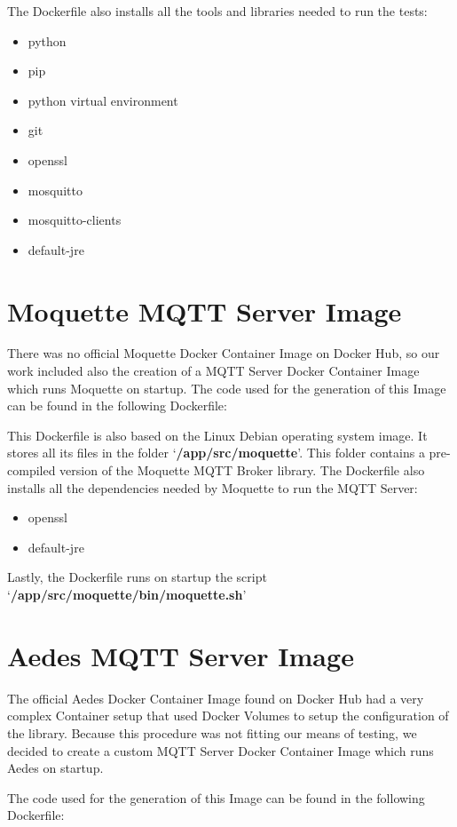 \documentclass[binding=0.6cm,noexaminfo]{sapthesis}
\begin{document}
The Dockerfile also installs all the tools and libraries needed to run the tests:
\begin{itemize}
	\item python
	\item pip
	\item python virtual environment
	\item git
	\item openssl
	\item mosquitto
	\item mosquitto-clients
	\item default-jre
\end{itemize}
\section{Moquette MQTT Server Image}
There was no official Moquette Docker Container Image on Docker Hub, so our work included also the creation of a MQTT Server Docker Container Image which runs Moquette on startup.
The code used for the generation of this Image can be found in the following Dockerfile:


This Dockerfile is also based on the Linux Debian operating system image. It stores all its files in the folder `\textbf{/app/src/moquette}'. This folder contains a pre-compiled version of the Moquette MQTT Broker library.
The Dockerfile also installs all the dependencies needed by Moquette to run the MQTT Server:
\begin{itemize}
	\item openssl
	\item default-jre
\end{itemize}
Lastly, the Dockerfile runs on startup the script `\textbf{/app/src/moquette/bin/moquette.sh}'
\section{Aedes MQTT Server Image}
The official Aedes Docker Container Image found on Docker Hub had a very complex Container setup that used Docker Volumes to setup the configuration of the library. Because this procedure was not fitting our means of testing, we decided to create a custom MQTT Server Docker Container Image which runs Aedes on startup.

The code used for the generation of this Image can be found in the following Dockerfile:

\end{document}
